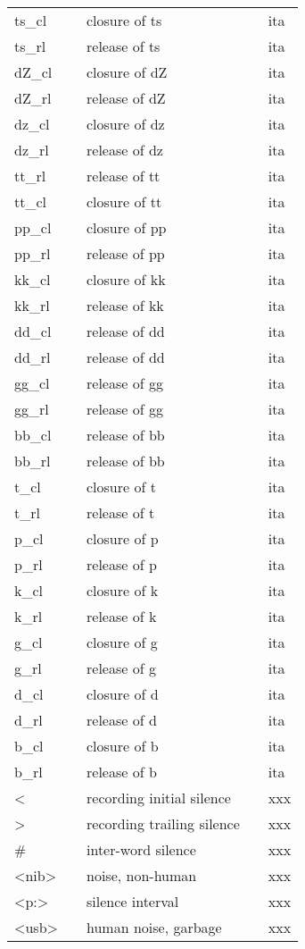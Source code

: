 \begin{longtable}{llp{}ll}
	ts\_cl & & closure of ts & & ita\\
	ts\_rl & & release of ts & & ita\\
	dZ\_cl & & closure of dZ & & ita\\
	dZ\_rl & & release of dZ & & ita\\
	dz\_cl & & closure of dz & & ita\\
	dz\_rl & & release of dz & & ita\\
	tt\_rl & & release of tt & & ita\\
	tt\_cl & & closure of tt & & ita\\
	pp\_cl & & closure of pp & & ita\\
	pp\_rl & & release of pp & & ita\\
	kk\_cl & & closure of kk & & ita\\
	kk\_rl & & release of kk & & ita\\
	dd\_cl & & release of dd & & ita\\
	dd\_rl & & release of dd & & ita\\
	gg\_cl & & release of gg & & ita\\
	gg\_rl & & release of gg & & ita\\
	bb\_cl & & release of bb & & ita\\
	bb\_rl & & release of bb & & ita\\
	t\_cl & & closure of t & & ita\\
	t\_rl & & release of t & & ita\\
	p\_cl & & closure of p & & ita\\
	p\_rl & & release of p & & ita\\
	k\_cl & & closure of k & & ita\\
	k\_rl & & release of k & & ita\\
	g\_cl & & closure of g & & ita\\
	g\_rl & & release of g & & ita\\
	d\_cl & & closure of d & & ita\\
	d\_rl & & release of d & & ita\\
	b\_cl & & closure of b & & ita\\
	b\_rl & & release of b & & ita\\
	\textless & & recording initial silence & & xxx\\
	\textgreater & & recording trailing silence & & xxx\\
	\# & & inter-word silence & & xxx\\
	\textless nib\textgreater & & noise, non-human & & xxx\\
	\textless p:\textgreater & & silence interval & & xxx\\
	\textless usb\textgreater & & human noise, garbage & & xxx\\
\end{longtable}

